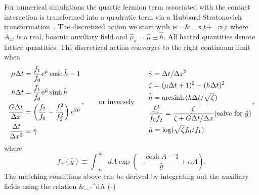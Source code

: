 \documentclass[aps,eqsecnum,amsmath,onecolumn,groupedaddress,superscriptaddress,notitlepage,nofootinbib]{revtex4-1}
\newcommand{\beq}{\begin{equation}}
\newcommand{\eeq}{\end{equation}}
\def\beqs#1\eeqs{\beq\begin{split} #1 \end{split}\eeq}
\def\spl#1{\begin{split} #1 \end{split}}
\newcommand{\eq}[1]{Eq.~(\ref{#1})}
\begin{document}
For numerical simulations the quartic fermion term associated with the contact interaction
is transformed into a quadratic term via a Hubbard-Stratonovich transformation~\cite{Hubbard:1959ub}. The discretized action we start with is
\beqs
S =& \sum_{x,t}{}+\sum_{\sigma;x,t} 
\label{eq:lattice-action-dimless}
\eeqs 
where $A_{xt}$ is a real, bosonic auxiliary field and $\hat\mu_\sigma = \hat\mu \pm \hat h$.
All hatted quantities denote lattice quantities. The discretized action converges to the 
right continuum limit when
\beq
\spl{
\mu \Delta t &= \frac{f_1}{f_0}\text{e}^{\hat \mu}\cosh\hat h-1\\
h \Delta t & = \frac{f_1}{f_0}\text{e}^{\hat \mu}\sinh \hat h\\
\frac{G \Delta t}{\Delta x}&= \left(\frac{f_2}{f_0}-\frac{f^2_1}{f^2_0} \right)e^{2\hat \mu} \\
\frac{\Delta t}{\Delta x^2} &= \hat \gamma  }\,,
\qquad\text{or inversely}\qquad
\spl{
&\hat\gamma = \Delta t/\Delta x^2 \\
&\zeta = (\mu \Delta t+1)^2-(h\Delta t)^2 \\
&\hat h = {\rm arcsinh\,}( h\Delta t/\sqrt\zeta)\\
&\frac{f_1^2}{f_0 f_2} = \frac\zeta{\zeta+G\Delta t/\Delta x} (\text{solve for $\hat g$})\\
&\hat\mu = \log (\sqrt\zeta f_0/f_1)
}\, ,
\label{eq:phys-coups}
\eeq
where
\beq
f_\alpha(\hat g) \equiv \int_{-\infty}^\infty dA \exp\left(-\frac{\cosh A-1}{\hat g}+\alpha A\right)  .
\eeq The matching
conditions above can be derived by integrating out the auxiliary fields using the relation
\beqs
&\int_{-\infty}^\infty dA \exp\left(-\right) \, 
\end{document}
